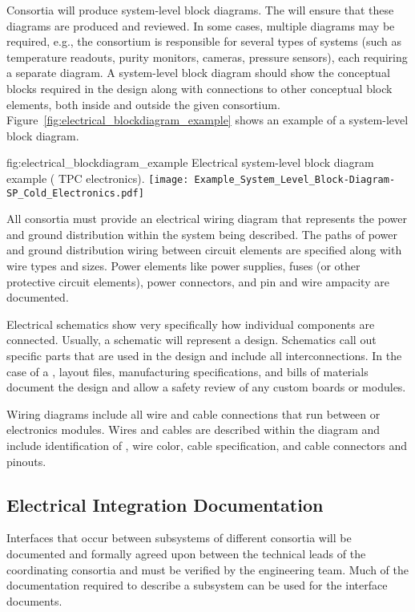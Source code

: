 Consortia will produce system-level block diagrams. The 
will ensure that these diagrams are produced and reviewed.  In some
cases, multiple diagrams may be required, e.g., the 
consortium is responsible for several types of systems (such as
temperature readouts, purity monitors, cameras, pressure sensors),
each requiring a separate diagram. A system-level block diagram should
show the conceptual blocks required in the design along with
connections to other conceptual block elements, both inside and
outside the given consortium.
Figure~\ref{fig:electrical_blockdiagram_example} shows an example of a
system-level block diagram.
\begin{dunefigure}{fig:electrical_blockdiagram_example}
  {Electrical system-level block diagram example ( TPC electronics).}
 \texttt{[image: Example\_System\_Level\_Block-Diagram-SP\_Cold\_Electronics.pdf]}
\end{dunefigure}


All consortia must provide an electrical wiring diagram that 
represents the power and ground distribution within the system being
described.  The paths of power and ground distribution wiring between
circuit elements are specified along with wire types and sizes.  Power
elements like power supplies, fuses (or other protective circuit
elements), power connectors, and pin and wire ampacity are documented.


Electrical schematics show very specifically how individual
components are connected.  Usually, a schematic will represent a
 design.  Schematics call out specific
parts that are used in the design and include all interconnections.
In the case of a , layout files, manufacturing
specifications, and bills of materials document
the design and allow a safety review of any custom boards or
modules.


Wiring diagrams include all wire and cable connections that run
between  or electronics modules.  Wires and
cables are described within the diagram and include identification of
, wire color, cable specification, and
cable connectors and pinouts.


\subsection{Electrical Integration Documentation}
\label{sec:fdsp-coord-integ-electrical}

Interfaces that occur between subsystems of different consortia will
be documented and formally agreed upon between the technical leads of
the coordinating consortia and must be verified by the  engineering 
team.  Much of the documentation required to describe a subsystem can
be used for the interface documents.

